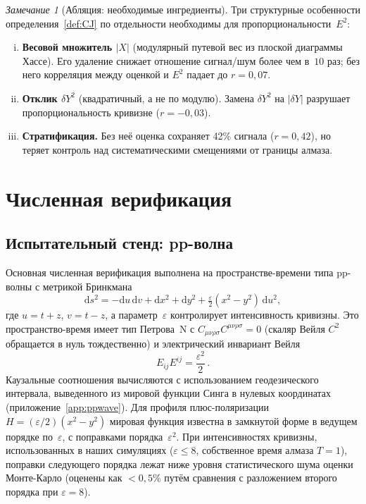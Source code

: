 \documentclass[12pt,a4paper]{article}
\theoremstyle{plain}
\theoremstyle{definition}
\theoremstyle{remark}
\newtheorem{remark}[theorem]{Замечание}
\newcommand{\dd}{\mathrm{d}}
\newcommand{\Esq}{E_{ij}E^{ij}}
\begin{document}
\begin{remark}[Абляция: необходимые ингредиенты]
\label{rem:ablation}
Три структурные особенности определения~\ref{def:CJ}
по отдельности необходимы для пропорциональности~$E^2$:
\begin{enumerate}[(i)]
\item \textbf{Весовой множитель $|X|$} (модулярный
  путевой вес из плоской диаграммы Хассе).  Его удаление
  снижает отношение сигнал/шум более чем в~$10$ раз;
  без него корреляция между оценкой и $E^2$ падает до
  $r = 0{,}07$.
\item \textbf{Отклик $\delta Y^2$} (квадратичный, а не
  по модулю).  Замена $\delta Y^2$ на $|\delta Y|$
  разрушает пропорциональность кривизне ($r = -0{,}03$).
\item \textbf{Стратификация.}  Без неё оценка сохраняет
  42\% сигнала ($r = 0{,}42$), но теряет контроль над
  систематическими смещениями от границы алмаза.
\end{enumerate}
\end{remark}

\section{Численная верификация}
\label{sec:numerics}

\subsection{Испытательный стенд: pp-волна}
\label{sec:ppwave}

Основная численная верификация выполнена на
пространстве-времени типа pp-волны с метрикой Бринкмана
\begin{equation}\label{eq:ppwave}
  \dd s^2 = -\dd u\,\dd v + \dd x^2 + \dd y^2
  + \tfrac{\varepsilon}{2}(x^2 - y^2)\,\dd u^2,
\end{equation}
где $u = t+z$, $v = t-z$, а параметр~$\varepsilon$
контролирует интенсивность кривизны.  Это пространство-время
имеет тип Петрова~N с
$C_{\mu\nu\rho\sigma}C^{\mu\nu\rho\sigma} = 0$
(скаляр Вейля $C^2$ обращается в нуль тождественно) и
электрический инвариант Вейля~\cite{Wang:2019}
\begin{equation}\label{eq:E2ppw}
  \Esq = \frac{\varepsilon^2}{2}\,.
\end{equation}
Каузальные соотношения вычисляются с использованием
геодезического интервала, выведенного из мировой функции
Синга в нулевых координатах
(приложение~\ref{app:ppwave}).  Для профиля
плюс-поляризации
$H = (\varepsilon/2)(x^2 - y^2)$ мировая функция известна
в замкнутой форме в ведущем порядке по~$\varepsilon$, с
поправками порядка~$\varepsilon^2$.  При интенсивностях
кривизны, использованных в наших симуляциях
($\varepsilon \leq 8$, собственное время алмаза $T = 1$),
поправки следующего порядка лежат ниже уровня
статистического шума оценки Монте-Карло (оценены как
$< 0{,}5\%$ путём сравнения с разложением второго порядка
при $\varepsilon = 8$).
\end{document}
